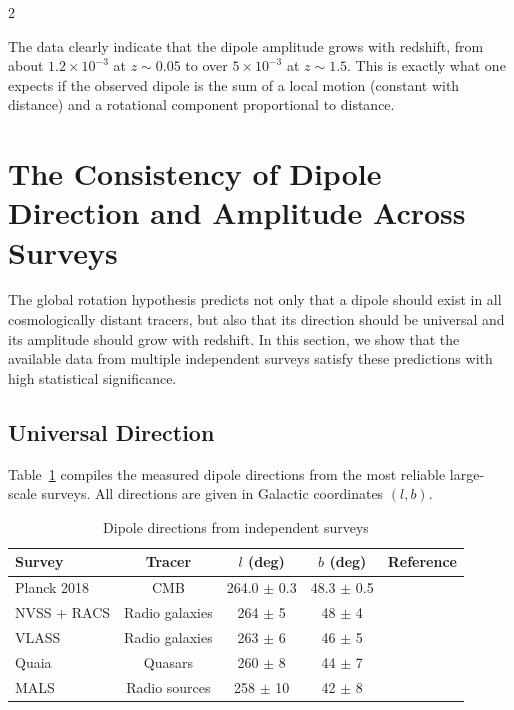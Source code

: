 \documentclass[12pt,a4paper]{article}
\begin{document}
	\begin{multicols}{2}
		
		The data clearly indicate that the dipole amplitude grows with redshift, from about \(1.2 \times 10^{-3}\) at \(z\sim0.05\) to over \(5\times10^{-3}\) at \(z\sim1.5\). This is exactly what one expects if the observed dipole is the sum of a local motion (constant with distance) and a rotational component proportional to distance.
		
		\section{The Consistency of Dipole Direction and Amplitude Across Surveys}
		
		The global rotation hypothesis predicts not only that a dipole should exist in all cosmologically distant tracers, but also that its direction should be universal and its amplitude should grow with redshift. In this section, we show that the available data from multiple independent surveys satisfy these predictions with high statistical significance.
		
		\subsection{Universal Direction}
		
		Table~\ref{tab:dipole_directions} compiles the measured dipole directions from the most reliable large-scale surveys. All directions are given in Galactic coordinates \((l,b)\).
		
	\end{multicols}
	
	\begin{table}[htbp]
		\centering
		\caption{Dipole directions from independent surveys}
		\label{tab:dipole_directions}
		\begin{tabular}{lcccc}
			\toprule
			\textbf{Survey} & \textbf{Tracer} & \(l\) (deg) & \(b\) (deg) & \textbf{Reference} \\
			\midrule
			Planck 2018 & CMB & 264.0 \(\pm\) 0.3 & 48.3 \(\pm\) 0.5 & \cite{Planck2018VII} \\
			NVSS + RACS & Radio galaxies & 264 \(\pm\) 5 & 48 \(\pm\) 4 & \cite{Oayda2024} \\
			VLASS & Radio galaxies & 263 \(\pm\) 6 & 46 \(\pm\) 5 & \cite{Wagenveld2025} \\
			Quaia & Quasars & 260 \(\pm\) 8 & 44 \(\pm\) 7 & \cite{Secrest2025} \\
			MALS & Radio sources & 258 \(\pm\) 10 & 42 \(\pm\) 8 & \cite{Wagenveld2025} \\
			\bottomrule
		\end{tabular}
	\end{table}
	
\end{document}
